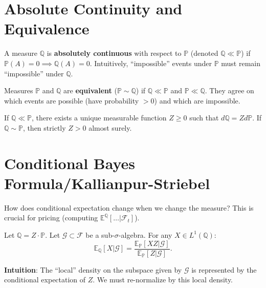 \section{Absolute Continuity and Equivalence}

\begin{definition}
A measure $\mathbb{Q}$ is \textbf{absolutely continuous} with respect to $\mathbb{P}$ (denoted $\mathbb{Q} \ll \mathbb{P}$) if $\mathbb{P}(A) = 0 \implies \mathbb{Q}(A) = 0$.
Intuitively, ``impossible'' events under $\mathbb{P}$ must remain ``impossible'' under $\mathbb{Q}$.
\end{definition}

\begin{definition}
Measures $\mathbb{P}$ and $\mathbb{Q}$ are \textbf{equivalent} ($\mathbb{P} \sim \mathbb{Q}$) if $\mathbb{Q} \ll \mathbb{P}$ and $\mathbb{P} \ll \mathbb{Q}$. They agree on which events are possible (have probability $> 0$) and which are impossible.
\end{definition}

\begin{theorem}
If $\mathbb{Q} \ll \mathbb{P}$, there exists a unique measurable function $Z \geq 0$ such that $d\mathbb{Q} = Z d\mathbb{P}$.
If $\mathbb{Q} \sim \mathbb{P}$, then strictly $Z > 0$ almost surely.
\end{theorem}

\section{Conditional Bayes Formula/Kallianpur-Striebel}
How does conditional expectation change when we change the measure? This is crucial for pricing (computing $\mathbb{E}^{\mathbb{Q}}[ \dots | \mathcal{F}_t ]$).

\begin{theorem}
Let $\mathbb{Q} = Z \cdot \mathbb{P}$. Let $\mathcal{G} \subset \mathcal{F}$ be a sub-$\sigma$-algebra. For any $X \in L^1(\mathbb{Q})$:
\[
\mathbb{E}_{\mathbb{Q}}[X | \mathcal{G}] = \frac{\mathbb{E}_{\mathbb{P}}[X Z | \mathcal{G}]}{\mathbb{E}_{\mathbb{P}}[Z | \mathcal{G}]}.
\]
\end{theorem}
\textbf{Intuition}: The ``local'' density on the subspace given by $\mathcal{G}$ is represented by the conditional expectation of $Z$. We must re-normalize by this local density.
